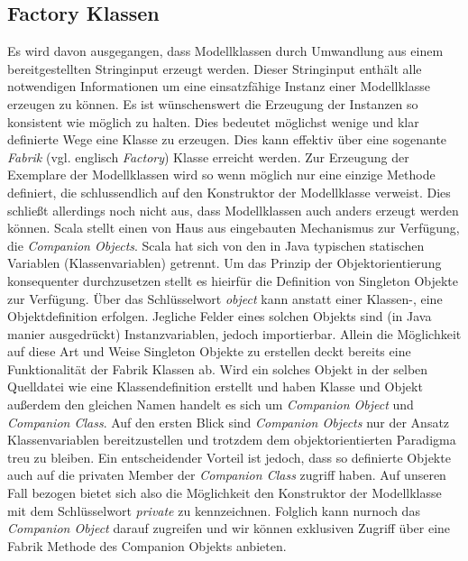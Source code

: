 \subsection{Factory Klassen}
Es wird davon ausgegangen, dass Modellklassen durch Umwandlung aus einem bereitgestellten Stringinput erzeugt werden. Dieser Stringinput enthält alle notwendigen Informationen um eine einsatzfähige Instanz einer Modellklasse erzeugen zu können. Es ist wünschenswert die Erzeugung der Instanzen so konsistent wie möglich zu halten. Dies bedeutet möglichst wenige und klar definierte Wege eine Klasse zu erzeugen. Dies kann effektiv über eine sogenante \textit{Fabrik} (vgl. englisch \textit{Factory}) Klasse erreicht werden. Zur Erzeugung der Exemplare der Modellklassen wird so wenn möglich nur eine einzige Methode definiert, die schlussendlich auf den Konstruktor der Modellklasse verweist. Dies schließt allerdings noch nicht aus, dass Modellklassen auch anders erzeugt werden können. Scala stellt einen von Haus aus eingebauten Mechanismus zur Verfügung, die \textit{Companion Objects}. Scala hat sich von den in Java typischen statischen Variablen (Klassenvariablen) getrennt. Um das Prinzip der Objektorientierung konsequenter durchzusetzen stellt es hieirfür die Definition von Singleton Objekte zur Verfügung. Über das Schlüsselwort \textit{object} kann anstatt einer Klassen-, eine Objektdefinition erfolgen. Jegliche Felder eines solchen Objekts sind (in Java manier ausgedrückt) Instanzvariablen, jedoch importierbar. Allein die Möglichkeit auf diese Art und Weise Singleton Objekte zu erstellen deckt bereits eine Funktionalität der Fabrik Klassen ab. Wird ein solches Objekt in der selben Quelldatei wie eine Klassendefinition erstellt und haben Klasse und Objekt außerdem den gleichen Namen handelt es sich um \textit{Companion Object} und \textit{Companion Class}. Auf den ersten Blick sind \textit{Companion Objects} nur der Ansatz Klassenvariablen bereitzustellen und trotzdem dem objektorientierten Paradigma treu zu bleiben. Ein entscheidender Vorteil ist jedoch, dass so definierte Objekte auch auf die privaten Member der \textit{Companion Class} zugriff haben. Auf unseren Fall bezogen bietet sich also die Möglichkeit den Konstruktor der Modellklasse mit dem Schlüsselwort \textit{private} zu kennzeichnen. Folglich kann nurnoch das \textit{Companion Object} darauf zugreifen und wir können exklusiven Zugriff über eine Fabrik Methode des Companion Objekts anbieten. 
